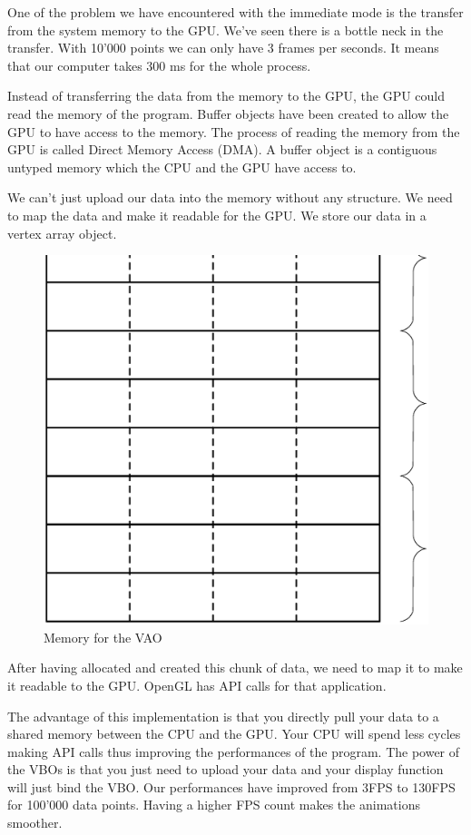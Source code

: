 One of the problem we have encountered with the immediate mode is the transfer from the system memory to the GPU.  We've seen there is a bottle neck in the transfer. With 10'000 points we can only have 3 frames per seconds. It means that our computer takes 300 ms for the whole process.

Instead of transferring the data from the memory to the GPU, the GPU could read the memory of the program. Buffer objects have been created to allow the GPU to have access to the memory. The process of reading the memory from the GPU is called Direct Memory Access (DMA). A buffer object is a contiguous untyped memory which the CPU and the GPU have access to.

We can't just upload our data into the memory without any structure. We need to map the data and make it readable for the GPU. We store our data in a vertex array object.

\begin{figure}[H]
  \centering
  \includegraphics[scale=0.2]{images/memory.eps}
    \caption{Memory for the VAO}
  \label{memoryVAO}
\end{figure}


After having allocated and created this chunk of data, we need to map it to make it readable to the GPU. OpenGL has API calls for that application.

The advantage of this implementation is that you directly pull your data to a shared memory between the CPU and the GPU. Your CPU will spend less cycles making API calls thus improving the performances of the program. The power of the VBOs is that you just need to upload your data and your display function will just bind the VBO. Our performances have improved from 3FPS to 130FPS for 100'000 data points. Having a higher FPS count makes the animations smoother.

